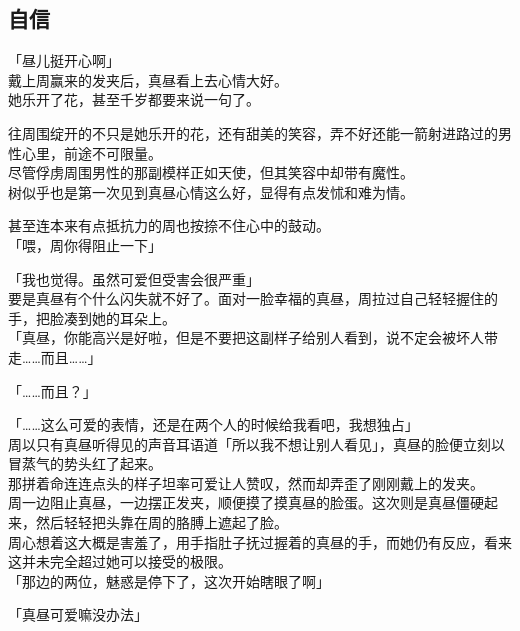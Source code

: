 \subsection{自信}

「昼儿挺开心啊」\\

戴上周赢来的发夹后，真昼看上去心情大好。\\

她乐开了花，甚至千岁都要来说一句了。

往周围绽开的不只是她乐开的花，还有甜美的笑容，弄不好还能一箭射进路过的男性心里，前途不可限量。\\

尽管俘虏周围男性的那副模样正如天使，但其笑容中却带有魔性。\\

树似乎也是第一次见到真昼心情这么好，显得有点发怵和难为情。

甚至连本来有点抵抗力的周也按捺不住心中的鼓动。\\

「喂，周你得阻止一下」

「我也觉得。虽然可爱但受害会很严重」\\

要是真昼有个什么闪失就不好了。面对一脸幸福的真昼，周拉过自己轻轻握住的手，把脸凑到她的耳朵上。\\

「真昼，你能高兴是好啦，但是不要把这副样子给别人看到，说不定会被坏人带走……而且……」

「……而且？」

「……这么可爱的表情，还是在两个人的时候给我看吧，我想独占」\\

周以只有真昼听得见的声音耳语道「所以我不想让别人看见」，真昼的脸便立刻以冒蒸气的势头红了起来。\\

那拼着命连连点头的样子坦率可爱让人赞叹，然而却弄歪了刚刚戴上的发夹。\\

周一边阻止真昼，一边摆正发夹，顺便摸了摸真昼的脸蛋。这次则是真昼僵硬起来，然后轻轻把头靠在周的胳膊上遮起了脸。\\

周心想着这大概是害羞了，用手指肚子抚过握着的真昼的手，而她仍有反应，看来这并未完全超过她可以接受的极限。\\

「那边的两位，魅惑是停下了，这次开始瞎眼了啊」

「真昼可爱嘛没办法」

